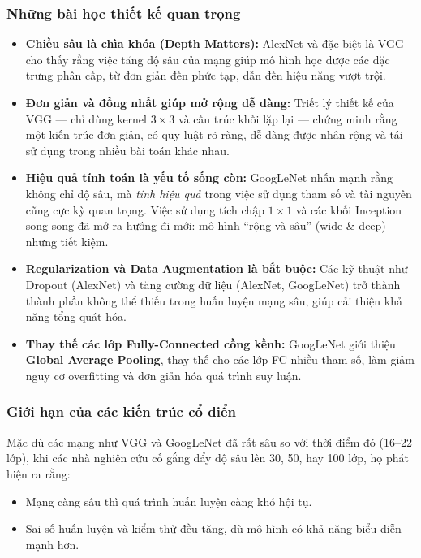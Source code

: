 \subsubsection*{Những bài học thiết kế quan trọng}
\begin{itemize}
	\item \textbf{Chiều sâu là chìa khóa (Depth Matters):}  
	AlexNet và đặc biệt là VGG cho thấy rằng việc tăng độ sâu của mạng giúp mô hình học được các đặc trưng phân cấp, từ đơn giản đến phức tạp, dẫn đến hiệu năng vượt trội.
	
	\item \textbf{Đơn giản và đồng nhất giúp mở rộng dễ dàng:}  
	Triết lý thiết kế của VGG — chỉ dùng kernel $3 \times 3$ và cấu trúc khối lặp lại — chứng minh rằng một kiến trúc đơn giản, có quy luật rõ ràng, dễ dàng được nhân rộng và tái sử dụng trong nhiều bài toán khác nhau.
	
	\item \textbf{Hiệu quả tính toán là yếu tố sống còn:}  
	GoogLeNet nhấn mạnh rằng không chỉ độ sâu, mà \textit{tính hiệu quả} trong việc sử dụng tham số và tài nguyên cũng cực kỳ quan trọng. Việc sử dụng tích chập $1 \times 1$ và các khối Inception song song đã mở ra hướng đi mới: mô hình “rộng và sâu” (wide \& deep) nhưng tiết kiệm.
	
	\item \textbf{Regularization và Data Augmentation là bắt buộc:}  
	Các kỹ thuật như Dropout (AlexNet) và tăng cường dữ liệu (AlexNet, GoogLeNet) trở thành thành phần không thể thiếu trong huấn luyện mạng sâu, giúp cải thiện khả năng tổng quát hóa.
	
	\item \textbf{Thay thế các lớp Fully-Connected cồng kềnh:}  
	GoogLeNet giới thiệu \textbf{Global Average Pooling}, thay thế cho các lớp FC nhiều tham số, làm giảm nguy cơ overfitting và đơn giản hóa quá trình suy luận.
\end{itemize}

\subsubsection*{Giới hạn của các kiến trúc cổ điển}
Mặc dù các mạng như VGG và GoogLeNet đã rất sâu so với thời điểm đó (16–22 lớp), khi các nhà nghiên cứu cố gắng đẩy độ sâu lên 30, 50, hay 100 lớp, họ phát hiện ra rằng:
\begin{itemize}
	\item Mạng càng sâu thì quá trình huấn luyện càng khó hội tụ.
	\item Sai số huấn luyện và kiểm thử đều tăng, dù mô hình có khả năng biểu diễn mạnh hơn.
\end{itemize}

